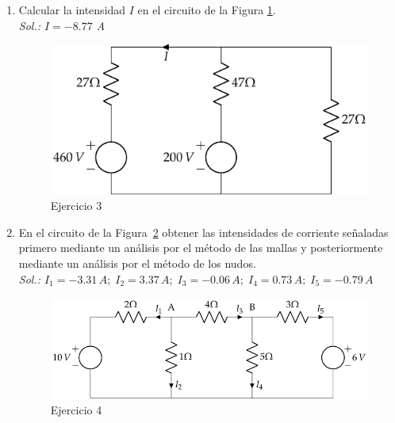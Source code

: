 \documentclass[11pt]{book} %
\begin{document}
\begin{enumerate}
\item Calcular la intensidad $I$ en el circuito de la Figura \ref{fig.ejercicio4_tema1}. \\
\emph{Sol.: $I=-8.77 $ A}
		\begin{figure}[h!]
			\centering
			\includegraphics{../figs/ej4_BT1.pdf}
			\caption{Ejercicio 3}
			\label{fig.ejercicio4_tema1}
		\end{figure}
		
		\item En el circuito de la Figura~\ref{fig.ejercicio8-bt1} obtener las intensidades de corriente señaladas primero mediante un análisis por el método de las mallas y posteriormente mediante un análisis por el método de los nudos.\\
\emph{Sol.: $I_1=-3.31\,A;\;I_2=3.37\,{A};\; I_3=-0.06\,{A};\; I_4=0.73\,{A};\; I_5=-0.79\,A$}
 \begin{figure}[h!]
 		\centering
\includegraphics{../figs/ej8_BT1.pdf}
 		\caption{Ejercicio 4}
 		\label{fig.ejercicio8-bt1}
 	\end{figure}
 	

\end{enumerate}
\end{document}
